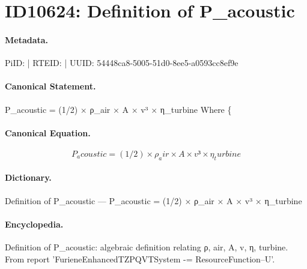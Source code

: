 \section*{ID10624: Definition of P\_acoustic}
\paragraph{Metadata.}
PiID:  | RTEID:  | UUID: 54448ca8-5005-51d0-8ee5-a0593cc8ef9e

\paragraph{Canonical Statement.}
P\_acoustic = (1/2) × ρ\_air × A × v³ × η\_turbine Where \{

\paragraph{Canonical Equation.}
\[
P_acoustic = (1/2) × ρ_air × A × v³ × η_turbine
\]

\paragraph{Dictionary.}
Definition of P\_acoustic — P\_acoustic = (1/2) × ρ\_air × A × v³ × η\_turbine

\paragraph{Encyclopedia.}
Definition of P\_acoustic: algebraic definition relating ρ, air, A, v, η, turbine. From report 'FurieneEnhancedTZPQVTSystem -= ResourceFunction--U'.
